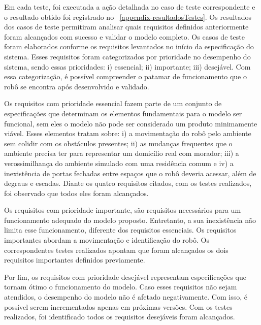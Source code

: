 Em cada teste, foi executada a ação detalhada no caso de teste correspondente e o resultado obtido foi registrado no \appendixautorefname~\ref{appendix-resultadosTestes}. Os resultados dos casos de teste permitiram analisar quais requisitos definidos anteriormente foram alcançados com sucesso e validar o modelo completo. Os casos de teste foram elaborados conforme os requisitos levantados no início da especificação do sistema. Esses requisitos foram categorizados por prioridade no desempenho do sistema, sendo essas prioridades: i) essencial; ii) importante; iii) desejável. Com essa categorização, é possível compreender o patamar de funcionamento que o robô se encontra após desenvolvido e validado.

Os requisitos com prioridade essencial fazem parte de um conjunto de especificações que determinam os elementos fundamentais para o modelo ser funcional, sem eles o modelo não pode ser considerado um produto minimamente viável. Esses elementos tratam sobre: i) a movimentação do robô pelo ambiente sem colidir com os obstáculos presentes; ii) as mudanças frequentes que o ambiente precisa ter para representar um domicílio real com morador; iii) a verossimilhança do ambiente simulado com uma residência comum e iv) a inexistência de portas fechadas entre espaços que o robô deveria acessar, além de degraus e escadas. Diante os quatro requisitos citados, com os testes realizados, foi observado que todos eles foram alcançados.

Os requisitos com prioridade importante, são requisitos necessários para um funcionamento adequado do modelo proposto. Entretanto, a sua inexistência não limita esse funcionamento, diferente dos requisitos essenciais. Os requisitos importantes abordam a movimentação e identificação do robô. Os correspondentes testes realizados apontam que foram alcançados os dois requisitos importantes definidos previamente.

Por fim, os requisitos com prioridade desejável representam especificações que tornam ótimo o funcionamento do modelo. Caso esses requisitos não sejam atendidos, o desempenho do modelo não é afetado negativamente. Com isso, é possível serem incrementados apenas em próximas versões. Com os testes realizados, foi identificado todos os requisitos desejáveis foram alcançados.

